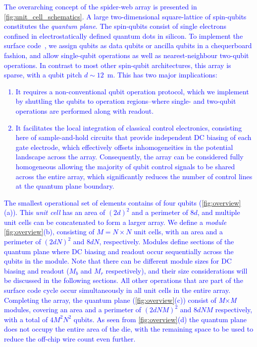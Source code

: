 \documentclass[aps,prl,reprint,superscriptaddress,floatfix]{revtex4-1}
\begin{document}
\textcolor{blue}{
  The overarching concept of the spider-web array is presented in \autoref{fig:unit_cell_schematics}.
  A large two-dimensional square-lattice of spin-qubits constitutes the \textit{quantum plane}.
  The spin-qubits consist of single electrons confined in electrostatically defined quantum dots in silicon.
  To implement the surface code~\cite{Dennis2002}, we assign qubits as data qubits or ancilla qubits in a chequerboard fashion, and allow single-qubit operations as well as nearest-neighbour two-qubit operations.   
  In contrast to most other spin-qubit architectures, this array is sparse, with a qubit pitch $d \sim 12$~\textmu m.
  This has two major implications:
  \begin{enumerate}
    \item It requires a non-conventional qubit operation protocol, which we implement by shuttling the qubits to operation regions--where single- and two-qubit operations are performed along with readout.
    \item It facilitates the local integration of classical control electronics, consisting here of sample-and-hold circuits that provide independent DC biasing of each gate electrode, which effectively offsets inhomogeneities in the potential landscape across the array.
    Consequently, the array can be considered fully homogeneous allowing the majority of qubit control signals to be shared across the entire array, which significantly reduces the number of control lines at the quantum plane boundary.
  \end{enumerate}
  The smallest operational set of elements contains of four qubits (\autoref{fig:overview}(a)).
  This \textit{unit cell} has an area of $(2d)^2$ and a perimeter of $8d$, and multiple unit cells can be concatenated to form a larger array.
  We define a \textit{module} \autoref{fig:overview}(b), consisting of $M = N \times N$ unit cells, with an area and a perimeter of $(2dN)^2$ and $8dN$, respectively.
  Modules define sections of the quantum plane where DC biasing and readout occur sequentially across the qubits in the module.
  Note that there can be different module sizes for DC biasing and readout ($M_b$ and $M_r$ respectively), and their size considerations will be discussed in the following sections.
  All other operations that are part of the surface code cycle occur simultaneously in all unit cells in the entire array.
  Completing the array, the quantum plane (\autoref{fig:overview}(c)) consist of \textit{M$\times$M} modules, covering an area and a perimeter of $(2dNM)^2$ and $8dNM$ respectively, with a total of $4M^2N^2$ qubits.
  As seen from \autoref{fig:overview}(d) the quantum plane does not occupy the entire area of the die, with the remaining space to be used to reduce the off-chip wire count even further. 
}
\end{document}
